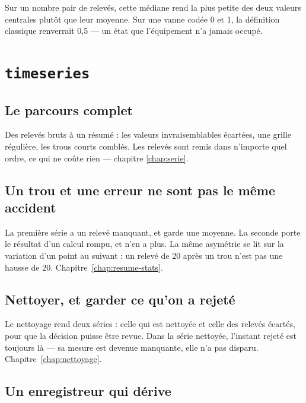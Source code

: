Sur un nombre pair de relevés, cette médiane rend la plus petite des
deux valeurs centrales plutôt que leur moyenne. Sur une vanne codée 0
et 1, la définition classique renverrait 0,5 --- un état que
l'équipement n'a jamais occupé.



\section{\texttt{timeseries}}

\subsection{Le parcours complet}

Des relevés bruts à un résumé : les valeurs invraisemblables écartées,
une grille régulière, les trous courts comblés. Les relevés sont remis
dans n'importe quel ordre, ce qui ne coûte rien --- chapitre
\ref{chap:serie}.



\subsection{Un trou et une erreur ne sont pas le même accident}

La première série a un relevé manquant, et garde une moyenne. La
seconde porte le résultat d'un calcul rompu, et n'en a plus. La même
asymétrie se lit sur la variation d'un point au suivant : un relevé de
20 après un trou n'est pas une hausse de 20.
Chapitre~\ref{chap:resume-stats}.



\subsection{Nettoyer, et garder ce qu'on a rejeté}

Le nettoyage rend deux séries : celle qui est nettoyée et celle des
relevés écartés, pour que la décision puisse être revue. Dans la série
nettoyée, l'instant rejeté est toujours là --- sa mesure est devenue
manquante, elle n'a pas disparu. Chapitre~\ref{chap:nettoyage}.



\subsection{Un enregistreur qui dérive}

